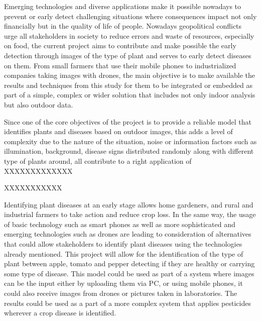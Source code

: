 \documentclass[conference]{IEEEtran}
\begin{document}
Emerging technologies and diverse applications make it possible nowadays to prevent or early detect challenging situations where consequences impact not only financially but in the quality of life of people. Nowadays geopolitical conflicts urge all stakeholders in society to reduce errors and waste of resources, especially on food, the current project aims to contribute and make possible the early detection through images of the type of plant and serves to early detect diseases on them. From small farmers that use their mobile phones to industrialized companies taking images with drones, the main objective is to make available the results and techniques from this study for them to be integrated or embedded as part of a simple, complex or wider solution that includes not only indoor analysis but also outdoor data. 


Since one of the core objectives of the project is to provide a reliable model that identifies plants and diseases based on outdoor images, this adds a level of complexity due to the nature of the situation, noise or information factors such as illumination, background, disease signs distributed randomly along with different type of plants around, all contribute to a right application of XXXXXXXXXXXXX 


XXXXXXXXXXX 

Identifying plant diseases at an early stage allows home gardeners, and rural and industrial farmers to take action and reduce crop loss. In the same way, the usage of basic technology such as smart phones as well as more sophisticated and emerging technologies such as drones are leading to consideration of alternatives that could allow stakeholders to identify plant diseases using the technologies already mentioned. This project will allow for the identification of the type of plant between apple, tomato and pepper detecting if they are healthy or carrying some type of disease. This model could be used as part of a system where images can be the input either by uploading them via PC, or using mobile phones, it could also receive images from drones or pictures taken in laboratories. The results could be used as a part of a more complex system that applies pesticides wherever a crop disease is identified. 
\end{document}
